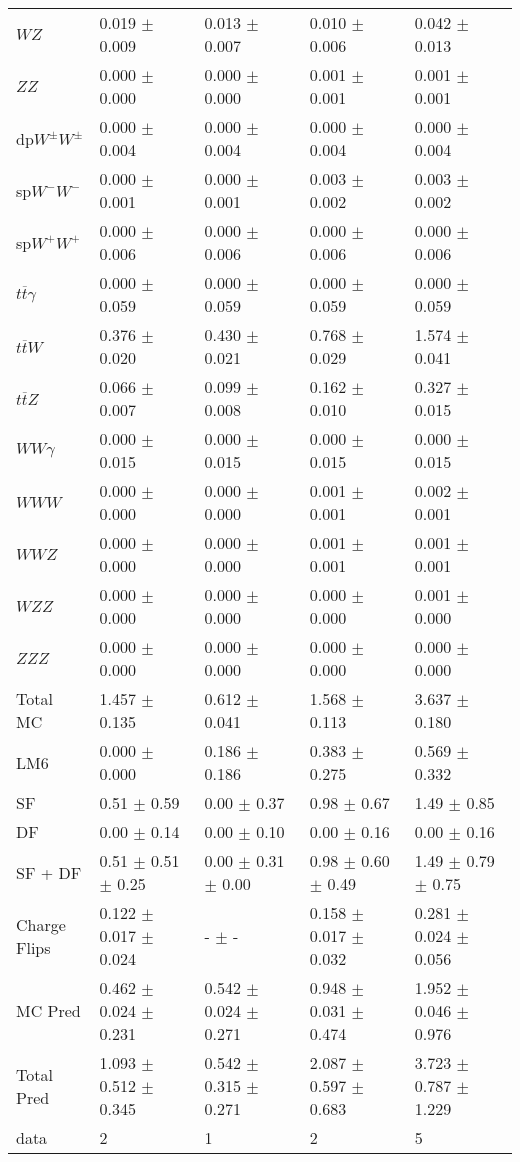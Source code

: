 \begin{tabular}{l | l l l l}
$WZ$ &  0.019 $\pm$  0.009 &  0.013 $\pm$  0.007 &  0.010 $\pm$  0.006 &  0.042 $\pm$  0.013\\
$ZZ$ &  0.000 $\pm$   0.000 &  0.000 $\pm$   0.000 &  0.001 $\pm$  0.001 &  0.001 $\pm$  0.001\\
\hline
dp$W^{\pm}W^{\pm}$ &  0.000 $\pm$  0.004 &  0.000 $\pm$  0.004 &  0.000 $\pm$  0.004 &  0.000 $\pm$  0.004\\
sp$W^{-}W^{-}$ &  0.000 $\pm$  0.001 &  0.000 $\pm$  0.001 &  0.003 $\pm$  0.002 &  0.003 $\pm$  0.002\\
sp$W^{+}W^{+}$ &  0.000 $\pm$  0.006 &  0.000 $\pm$  0.006 &  0.000 $\pm$  0.006 &  0.000 $\pm$  0.006\\
$t\overline{t}\gamma$ &  0.000 $\pm$  0.059 &  0.000 $\pm$  0.059 &  0.000 $\pm$  0.059 &  0.000 $\pm$  0.059\\
$t\overline{t}W$ &  0.376 $\pm$  0.020 &  0.430 $\pm$  0.021 &  0.768 $\pm$  0.029 &  1.574 $\pm$  0.041\\
$t\overline{t}Z$ &  0.066 $\pm$  0.007 &  0.099 $\pm$  0.008 &  0.162 $\pm$  0.010 &  0.327 $\pm$  0.015\\
$WW\gamma$ &  0.000 $\pm$  0.015 &  0.000 $\pm$  0.015 &  0.000 $\pm$  0.015 &  0.000 $\pm$  0.015\\
$WWW$ &   0.000 $\pm$   0.000 &   0.000 $\pm$   0.000 &  0.001 $\pm$  0.001 &  0.002 $\pm$  0.001\\
$WWZ$ &  0.000 $\pm$   0.000 &  0.000 $\pm$   0.000 &  0.001 $\pm$  0.001 &  0.001 $\pm$  0.001\\
$WZZ$ &   0.000 $\pm$   0.000 &   0.000 $\pm$   0.000 &   0.000 $\pm$   0.000 &  0.001 $\pm$   0.000\\
$ZZZ$ &   0.000 $\pm$   0.000 &   0.000 $\pm$   0.000 &   0.000 $\pm$   0.000 &   0.000 $\pm$   0.000\\
\hline
Total MC &  1.457 $\pm$  0.135 &  0.612 $\pm$  0.041 &  1.568 $\pm$  0.113 &  3.637 $\pm$  0.180\\
\hline\hline
\hline
LM6 &  0.000 $\pm$  0.000 &  0.186 $\pm$  0.186 &  0.383 $\pm$  0.275 &  0.569 $\pm$  0.332\\
\hline\hline
\hline\hline
 SF  & 0.51 $\pm$ 0.59 & 0.00 $\pm$ 0.37 & 0.98 $\pm$ 0.67 & 1.49 $\pm$ 0.85\\
 DF  & 0.00 $\pm$ 0.14 & 0.00 $\pm$ 0.10 & 0.00 $\pm$ 0.16 & 0.00 $\pm$ 0.16\\
\hline
 SF + DF  & 0.51 $\pm$ 0.51 $\pm$ 0.25 & 0.00 $\pm$ 0.31 $\pm$ 0.00 & 0.98 $\pm$ 0.60 $\pm$ 0.49 & 1.49 $\pm$ 0.79 $\pm$ 0.75\\
\hline\hline
Charge Flips & 0.122 $\pm$ 0.017 $\pm$ 0.024 & - $\pm$ - & 0.158 $\pm$ 0.017 $\pm$ 0.032 & 0.281 $\pm$ 0.024 $\pm$ 0.056\\
\hline\hline
\hline
MC Pred &  0.462 $\pm$  0.024 $\pm$  0.231 &  0.542 $\pm$  0.024 $\pm$  0.271 &  0.948 $\pm$  0.031 $\pm$  0.474 &  1.952 $\pm$  0.046 $\pm$  0.976\\
\hline\hline
Total Pred &  1.093 $\pm$  0.512 $\pm$  0.345 &  0.542 $\pm$  0.315 $\pm$  0.271 &  2.087 $\pm$  0.597 $\pm$  0.683 &  3.723 $\pm$  0.787 $\pm$  1.229\\
\hline\hline
data & 2 & 1 & 2 & 5\\
\hline\hline
\end{tabular}
